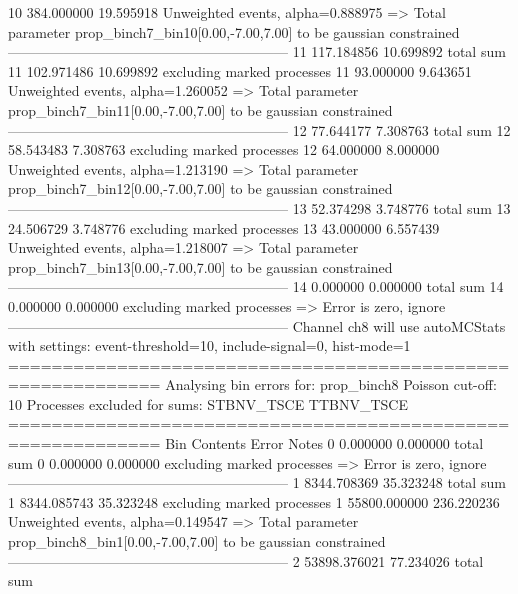 10         384.000000      19.595918       Unweighted events, alpha=0.888975
  => Total parameter prop_binch7_bin10[0.00,-7.00,7.00] to be gaussian constrained
------------------------------------------------------------
11         117.184856      10.699892       total sum                     
11         102.971486      10.699892       excluding marked processes    
11         93.000000       9.643651        Unweighted events, alpha=1.260052
  => Total parameter prop_binch7_bin11[0.00,-7.00,7.00] to be gaussian constrained
------------------------------------------------------------
12         77.644177       7.308763        total sum                     
12         58.543483       7.308763        excluding marked processes    
12         64.000000       8.000000        Unweighted events, alpha=1.213190
  => Total parameter prop_binch7_bin12[0.00,-7.00,7.00] to be gaussian constrained
------------------------------------------------------------
13         52.374298       3.748776        total sum                     
13         24.506729       3.748776        excluding marked processes    
13         43.000000       6.557439        Unweighted events, alpha=1.218007
  => Total parameter prop_binch7_bin13[0.00,-7.00,7.00] to be gaussian constrained
------------------------------------------------------------
14         0.000000        0.000000        total sum                     
14         0.000000        0.000000        excluding marked processes    
  => Error is zero, ignore      
------------------------------------------------------------
Channel ch8 will use autoMCStats with settings: event-threshold=10, include-signal=0, hist-mode=1
============================================================
Analysing bin errors for: prop_binch8
Poisson cut-off: 10
Processes excluded for sums: STBNV_TSCE TTBNV_TSCE
============================================================
Bin        Contents        Error           Notes                         
0          0.000000        0.000000        total sum                     
0          0.000000        0.000000        excluding marked processes    
  => Error is zero, ignore      
------------------------------------------------------------
1          8344.708369     35.323248       total sum                     
1          8344.085743     35.323248       excluding marked processes    
1          55800.000000    236.220236      Unweighted events, alpha=0.149547
  => Total parameter prop_binch8_bin1[0.00,-7.00,7.00] to be gaussian constrained
------------------------------------------------------------
2          53898.376021    77.234026       total sum                     
